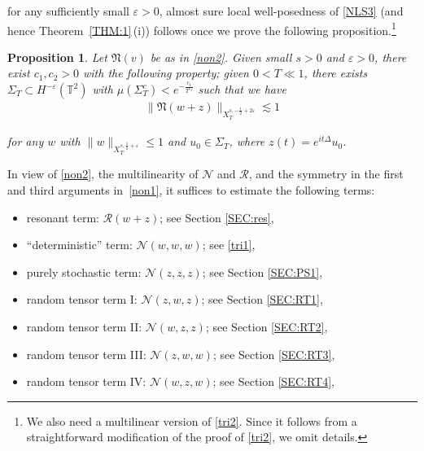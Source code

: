 \documentclass[%
11pt,  reqno]{amsart}
\newtheorem{proposition}[theorem]{Proposition}
\newcommand{\1}{\hspace{0.2mm}\text{I}\hspace{0.2mm}}
\newcommand{\noi}{\noindent}
\newcommand{\T}{\mathbb{T}}
\newcommand{\Nf}{\mathfrak{N}}
\newcommand{\Dl}{\Delta}
\newcommand{\eps}{\varepsilon}
\newcommand{\Si}{\Sigma}
\newcommand{\les}{\lesssim}
\newcommand{\NN}{\mathcal{N}}
\newcommand{\RR}{\mathcal{R}}
\numberwithin{equation}{section}
\numberwithin{theorem}{section}
\DeclareMathOperator{\Law}{Law}
\begin{document}
\noi
for any sufficiently small $\eps > 0$, 
almost sure local well-posedness of \eqref{NLS3}
(and hence Theorem~\ref{THM:1}\,(i))
follows once we prove the following proposition.\footnote{We also need
a multilinear version of \eqref{tri2}.
Since it follows from a straightforward modification of the proof of \eqref{tri2}, %
we omit details.}



\begin{proposition}\label{PROP:1}
Let $\Nf(v)$ be as in \eqref{non2}.
Given small   $s > 0$ and $\eps > 0$, 
there exist  $c_1, c_2 > 0$ 
with the following property; 
given  $0 < T \ll 1$, there exists $\Si_T \subset H^{-\eps}(\T^2)$
with $\mu (\Si_T^c) < e^{-\frac{c_1}{ T^{c_2}}}$ such that 
we have 
\begin{align}
\|\Nf (w + z)\|_{X^{s, -\frac 12 +2 \eps}_T} 
\les 1
\label{tri2}
\end{align}

\noi
for any    $w$ with $\|w\|_{X^{s, \frac 12 + \eps}_T} \le 1$
and $u_0 \in \Si_T$, 
where 
$z(t) = e^{it \Dl} u_0$. %

\end{proposition}




In view of 
\eqref{non2}, 
the multilinearity of $\NN$ and $\RR$, 
and the symmetry in the first and third arguments in~\eqref{non1}, 
it suffices to estimate  the following terms:

\smallskip

\begin{itemize}
\item[(i)]
resonant term: $\RR(w+z)$; see Section \ref{SEC:res}, 


\smallskip

\item[(ii)]
``deterministic'' term:
$\NN(w, w, w)$; see \eqref{tri1}, 


\smallskip

\item[(iii)]
purely stochastic term:
$\NN(z, z, z)$;
 see Section \ref{SEC:PS1}, 


\smallskip

\item[(iv)]
random tensor term I: $\NN(z, w, z)$; see Section \ref{SEC:RT1}, 


\smallskip

\item[(v)]
random tensor term II: $\NN (w, z, z)$; see Section \ref{SEC:RT2}, 


\smallskip

\item[(vi)]
random tensor term III: $\NN(z, w,w)$; see Section \ref{SEC:RT3},  


\smallskip

\item[(vii)]
random tensor term IV:  $\NN (w, z, w)$; see Section \ref{SEC:RT4}, 

\end{itemize}
\end{document}
